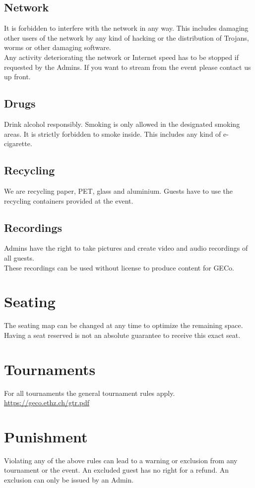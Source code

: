 \documentclass{article}
\begin{document}
\subsection{Network}
It is forbidden to interfere with the network in any way. This includes damaging other users of the network by any kind of hacking or the distribution of Trojans, worms or other damaging software.\\
Any activity deteriorating the network or Internet speed has to be stopped if requested by the Admins. If you want to stream from the event please contact us up front.


\subsection{Drugs}
Drink alcohol responsibly. 
Smoking is only allowed in the designated smoking areas.
It is strictly forbidden to smoke inside.
This includes any kind of e-cigarette. 

\subsection{Recycling}
We are recycling paper, PET, glass and aluminium. Guests have to use the recycling containers provided at the event.


\subsection{Recordings}
Admins have the right to take pictures and create video and audio recordings of all guests.\\
These recordings can be used without license to produce content for GECo.


\section{Seating}
The seating map can be changed at any time to optimize the remaining space.
Having a seat reserved is not an absolute guarantee to receive this exact seat.

\section{Tournaments}
For all tournaments the general tournament rules apply. \\ \url{https://geco.ethz.ch/gtr.pdf}


\section{Punishment}
Violating any of the above rules can lead to a warning or exclusion from any tournament or the event.
An excluded guest has no right for a refund.
An exclusion can only be issued by an Admin.
\end{document}

